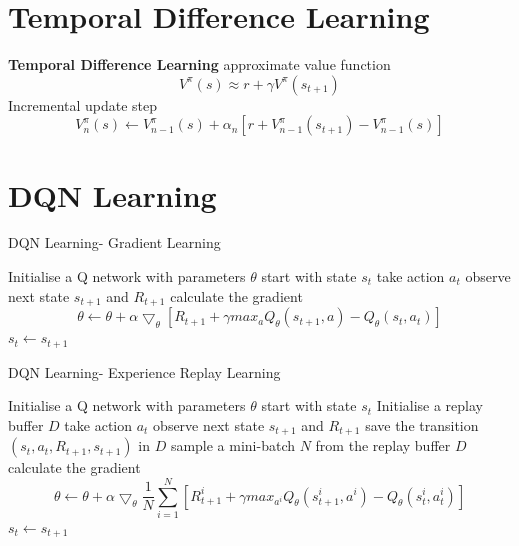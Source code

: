 \documentclass{article}
\begin{document}
\section*{Temporal Difference Learning}
\textbf{Temporal Difference Learning}
approximate value function
$$ V^\pi(s) \approx r + \gamma V^\pi(s_{t+1}) $$
Incremental update step
$$ V^\pi_n(s) \leftarrow V^\pi_{n-1}(s) + \alpha_n \left[ r + V^\pi_{n-1}(s_{t+1}) - V^\pi_{n-1}(s) \right]  $$
\section{DQN Learning}
\begin{algorithm}
\caption{DQN Learning- Gradient Learning}\label{alg:dqn}
\begin{algorithmic}
\State Initialise a Q network  with parameters $\theta$
\State start with state $s_t$
\State take action $a_t$ 
\State observe next state $s_{t+1}$ and $R_{t+1}$
\State calculate the gradient $$ \theta \leftarrow \theta + \alpha \bigtriangledown_\theta \left[ R_{t+1} + \gamma \textit{max}_{a} Q_\theta(s_{t+1}, a ) - Q_\theta(s_t, a_t) \right]$$
\State $s_t \leftarrow s_{t+1}$
\EndWhile
\end{algorithmic}
\end{algorithm}


\begin{algorithm}
\caption{DQN Learning- Experience Replay Learning}\label{alg:dqn_ex_replay}
\begin{algorithmic}
\State Initialise a Q network  with parameters $\theta$
\State start with state $s_t$
\State Initialise a replay buffer $D$
\State take action $a_t$ 
\State observe next state $s_{t+1}$ and $R_{t+1}$
\State save the transition $(s_t, a_t, R_{t+1}, s_{t+1})$ in $D$
\State sample a mini-batch $N$ from the replay buffer $D$
\State calculate the gradient $$ \theta \leftarrow \theta + \alpha \bigtriangledown_\theta \frac{1}{N}\sum\limits_{i=1}^N \left[ R_{t+1}^i + \gamma \textit{max}_{a^i} Q_\theta(s_{t+1}^i, a^i ) - Q_\theta(s_t^i, a_t^i) \right]$$
\EndWhile
\State $s_t \leftarrow s_{t+1}$
\EndWhile
\end{algorithmic}
\end{algorithm}
\end{document}
